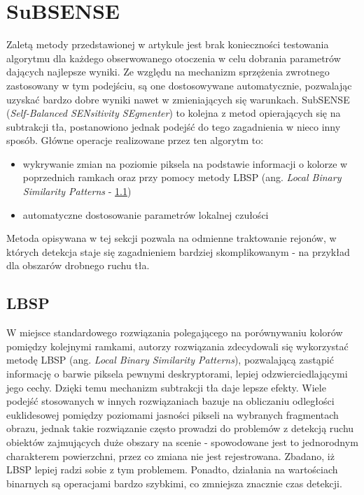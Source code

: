 \section{SuBSENSE}
Zaletą metody przedstawionej w artykule \cite{stflexible} jest brak konieczności testowania algorytmu dla każdego obserwowanego otoczenia w celu dobrania parametrów dających najlepsze wyniki. Ze względu na mechanizm sprzężenia zwrotnego zastosowany w tym podejściu, są one dostosowywane automatycznie, pozwalając uzyskać bardzo dobre wyniki nawet w zmieniających się warunkach. SubSENSE (\textit{Self-Balanced SENsitivity SEgmenter}) to kolejna z metod opierających się na subtrakcji tła, postanowiono jednak podejść do tego zagadnienia w nieco inny sposób. Główne operacje realizowane przez ten algorytm to:
\begin{itemize}
\item wykrywanie zmian na poziomie piksela na podstawie informacji o kolorze w poprzednich ramkach oraz przy pomocy metody LBSP (ang. \textit{Local Binary Similarity Patterns} - \ref{sec:LBSP})
\item automatyczne dostosowanie parametrów lokalnej czułości
\end{itemize}
Metoda opisywana w tej sekcji pozwala na odmienne traktowanie rejonów, w których detekcja staje się zagadnieniem bardziej skomplikowanym - na przykład dla obszarów drobnego ruchu tła. 
\subsection{LBSP}
\label{sec:LBSP}
W miejsce standardowego rozwiązania polegającego na porównywaniu kolorów pomiędzy kolejnymi ramkami, autorzy rozwiązania zdecydowali się wykorzystać metodę LBSP \cite{bilodeau2013change} (ang. \textit{Local Binary Similarity Patterns}), pozwalającą zastąpić informację o barwie piksela pewnymi deskryptorami, lepiej odzwierciedlającymi jego cechy. Dzięki temu mechanizm subtrakcji tła daje lepsze efekty. Wiele podejść stosowanych w innych rozwiązaniach bazuje na obliczaniu odległości euklidesowej pomiędzy poziomami jasności pikseli na wybranych fragmentach obrazu, jednak takie rozwiązanie często prowadzi do problemów z detekcją ruchu obiektów zajmujących duże obszary na scenie - spowodowane jest to jednorodnym charakterem powierzchni, przez co zmiana nie jest rejestrowana. Zbadano, iż LBSP lepiej radzi sobie z tym problemem. Ponadto, działania na wartościach binarnych są operacjami bardzo szybkimi, co zmniejsza znacznie czas detekcji.
